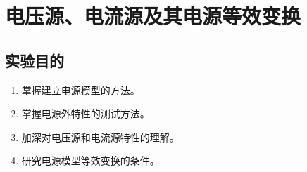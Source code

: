 \documentclass[UTF8]{article}
\begin{document}
    \section{电压源、电流源及其电源等效变换}
        \subsection{实验目的}
            \begin{enumerate}[label=\textbf{\arabic*}.]
                \item 掌握建立电源模型的方法。
                \item 掌握电源外特性的测试方法。
                \item 加深对电压源和电流源特性的理解。 
                \item 研究电源模型等效变换的条件。
            \end{enumerate}
\end{document}
